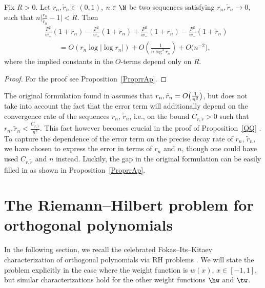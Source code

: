 \begin{Proposition} \label{Proprr}
Fix $R > 0$. Let $r_n, \tilde r_n \in (0, 1)$, $n \in \N$ be two sequences satisfying $r_n, \tilde r_n \to 0$, such that $n\big|\frac{r_n}{\tilde r_n}-1|< R$. Then
\begin{align*}\nonumber
 &\frac{F^2}{w_+}(1+r_n)-\frac{F^2}{w_+}(1+\tilde r_n)+\frac{F^2}{w_-}(1+r_n)-\frac{F^2}{w_-}(1+\tilde r_n)
 \\
 &\qquad= O(r_n \log |\log r_n |) + O\left(\frac{1}{n\log^3 r_n}\right) + O\big(n^{-2}\big),
\end{align*}
where the implied constants in the $O$-terms depend only on $R$.
\end{Proposition}
\begin{proof}
For the proof see Proposition~\ref{ProprrAp}.
\end{proof}
\begin{Remark}
The original formulation found in \cite[Proposition~A.4]{CD} assumes that $r_n, \tilde r_n = \smash{O\big(\frac{1}{n^2}\big)}$, but does not take into account the fact that the error term will additionally depend on the convergence rate of the sequences $r_n$, $\tilde r_n$, i.e., on the bound $C_{r, \tilde r} > 0$ such that $r_n, \tilde r_n < \frac{C_{r,\tilde r}}{n^2}$. This fact however becomes crucial in the proof of Proposition~\ref{QQ} \cite[Proposition~C.4]{CD}. To capture the dependence of the error term on the precise decay rate of $r_n$, $\tilde r_n$, we have chosen to express the error in terms of $r_n$ and $n$, though one could have used $C_{r,\tilde r}$ and $n$ instead. Luckily, the gap in the original formulation can be easily filled in as shown in Proposition~\ref{ProprrAp}.
\end{Remark}

\section{The Riemann--Hilbert problem for orthogonal polynomials}\label{RHProblems}

In the following section, we recall the celebrated Fokas--Its--Kitaev characterization of orthogonal polynomials via RH problems \cite{FIK}. We will state the problem explicitly in the case where the weight function is $w(x)$, $x\in[-1,1]$, but similar characterizations hold for the other weight functions $\hw$ and $\tw$.

